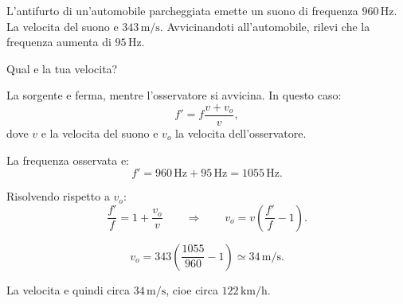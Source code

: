 
\begin{esercizio}
L'antifurto di un'automobile parcheggiata emette un suono di frequenza
\(960\,\mathrm{Hz}\). La velocita del suono e \(343\,\mathrm{m/s}\).
Avvicinandoti all'automobile, rilevi che la frequenza aumenta di
\(95\,\mathrm{Hz}\).

Qual e la tua velocita?
\end{esercizio}

\begin{soluzione}
La sorgente e ferma, mentre l'osservatore si avvicina. In questo caso:
\[
f'=f\frac{v+v_o}{v},
\]
dove \(v\) e la velocita del suono e \(v_o\) la velocita dell'osservatore.

La frequenza osservata e:
\[
f'=960\,\mathrm{Hz}+95\,\mathrm{Hz}
=1055\,\mathrm{Hz}.
\]

Risolvendo rispetto a \(v_o\):
\[
\frac{f'}{f}=1+\frac{v_o}{v}
\qquad\Rightarrow\qquad
v_o=v\left(\frac{f'}{f}-1\right).
\]

\[
v_o=343\left(\frac{1055}{960}-1\right)
\simeq 34\,\mathrm{m/s}.
\]

La velocita e quindi circa \(34\,\mathrm{m/s}\), cioe circa
\(122\,\mathrm{km/h}\).
\end{soluzione}
